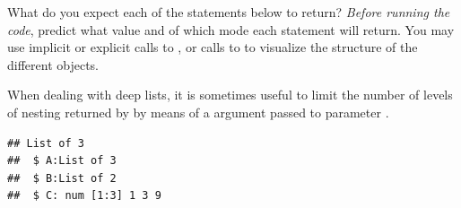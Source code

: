 \documentclass[krantz2]{krantz}\usepackage{knitr}
\begin{document}
\begin{playground}
What do you expect each of the statements below to return? \emph{Before running the code}, predict what value and of which mode each statement will return. You may use implicit or explicit calls to , or calls to  to visualize the structure of the different objects.

\begin{knitrout}\footnotesize
{}\color{fgcolor}\begin{kframe}
\begin{alltt}
 \hlkwb{<-} \hlstd{(} \hlstd{=} \hlstd{(}\hlstd{,} \hlstd{,} \hlstd{),}  \hlstd{=} \hlstd{(}\hlstd{,} \hlstd{))}
\hlstd{nested.list[}\hlopt{:}\hlstd{]}
\hlstd{nested.list[}\hlstd{]}
\hlstd{nested.list[[}\hlstd{]][}\hlstd{]}
\hlstd{nested.list[[}\hlstd{]][[}\hlstd{]]}
\hlstd{nested.list[}\hlstd{]}
\hlstd{nested.list[}\hlstd{][[}\hlstd{]]}
\end{alltt}
\end{kframe}
\end{knitrout}

\end{playground}

\begin{explainbox}
When dealing with deep lists, it is sometimes useful to limit the number of levels of nesting returned by  by means of a  argument passed to parameter .

\begin{knitrout}\footnotesize
{}\color{fgcolor}\begin{kframe}
\begin{alltt}
  \hlstd{=} \hlstd{)}
\end{alltt}
\begin{verbatim}
## List of 3
##  $ A:List of 3
##  $ B:List of 2
##  $ C: num [1:3] 1 3 9
\end{verbatim}
\end{kframe}
\end{knitrout}

\end{explainbox}
\end{document}
